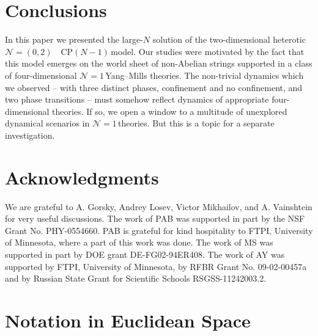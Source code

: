 \documentclass[epsfig,12pt]{article}
\newcommand{\none}{${\mathcal N}=1\,$}
\newcommand{\cpn}{CP$(N-1)\,$}
\newcommand{\ntwoo}{${\mathcal N}= \left(0,2\right) $ }
\begin{document}
{%



% 

\newpage

\section{Conclusions}
\label{conclu}

In this paper we presented the large-$N$ solution of the
two-dimensional  heterotic $\mbox{\ntwoo}$
\cpn model. Our studies were motivated by the fact
that this model emerges on the world sheet of non-Abelian strings
supported in a class of four-dimensional \none Yang--Mills theories.
The non-trivial dynamics which we observed -- with three distinct phases, confinement and no confinement,
 and two phase transitions --
must somehow reflect  dynamics of appropriate four-dimensional
 theories. If so, we open a window to a multitude of
unexplored dynamical scenarios in \none theories. But this is a topic for a separate investigation.

\section*{Acknowledgments}

We are grateful to A. Gorsky, Andrey Losev, Victor Mikhailov, and A. Vainshtein 
for very useful discussions.
The work of PAB was supported in part by the NSF Grant No. PHY-0554660. 
PAB is grateful for kind hospitality to FTPI, University of Minnesota, where a part of this work was done. 
The work of MS was supported in part by DOE grant DE-FG02-94ER408. 
The work of AY was  supported 
by  FTPI, University of Minnesota, 
by RFBR Grant No. 09-02-00457a 
and by Russian State Grant for 
Scientific Schools RSGSS-11242003.2.


\newpage

\setcounter{section}{0}
\renewcommand{\thesection}{\Alph{section}}

\section{Notation in Euclidean Space}
\label{app:eucl}
%
%

}
\end{document}
